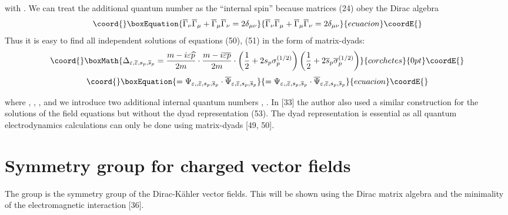 \documentclass[a4paper,12pt]{article}
\begin{document}
with \coordHE{}. We can treat the additional quantum
number \coordHE{} as the ``internal spin'' because matrices
(24) obey the Dirac algebra
\begin{equation}\coord{}\boxEquation{
\overline{\Gamma }_\nu \overline{\Gamma }_\mu +\overline{\Gamma
}_\mu \overline{\Gamma }_\nu =2\delta _{\mu \nu }  \label{52}
}{
\overline{\Gamma }_\nu \overline{\Gamma }_\mu +\overline{\Gamma
}_\mu \overline{\Gamma }_\nu =2\delta _{\mu \nu }  }{ecuacion}\coordE{}\end{equation}
Thus it is easy to find all independent solutions of equations (50), (51) in
the form of matrix-dyads:
\[\coord{}\boxMath{
\Delta _{\varepsilon ,\overline{\varepsilon
},s_p,\overline{s}_p}=\frac{ m-i\varepsilon \widehat{p}}{2m}\cdot
\frac{m-i\overline{\varepsilon } \overline{p}}{2m}\cdot \left(
\frac 12+2s_p\sigma _p^{(1/2)}\right) \left( \frac
12+2\overline{s}_p\overline{\sigma }_p^{(1/2)}\right)
}{corchetes}{0pt}\coordE{}\]
\begin{equation}\coord{}\boxEquation{
=\Psi _{\varepsilon ,,\overline{\varepsilon },s_p,\overline{s}_p}\cdot
\overline{\Psi }_{\varepsilon ,\overline{\varepsilon },s_p,\overline{s}_p}
\label{53}
}{
=\Psi _{\varepsilon ,,\overline{\varepsilon },s_p,\overline{s}_p}\cdot
\overline{\Psi }_{\varepsilon ,\overline{\varepsilon },s_p,\overline{s}_p}
}{ecuacion}\coordE{}\end{equation}

where \coordHE{}, \coordHE{},
\coordHE{}, and we introduce two additional internal quantum
numbers \coordHE{}, \coordHE{}. In [33] the author also used a similar construction for the
solutions of the field equations but without the dyad
representation (53). The dyad representation is essential as all
quantum electrodynamics calculations can only be done using
matrix-dyads [49, 50].

\section{Symmetry group \coordHE{} for charged vector fields}

The group \coordHE{} is the symmetry group of the Dirac-K\"ahler vector
fields. This will be shown using the Dirac matrix algebra and the minimality
of the electromagnetic interaction [36].
\end{document}
